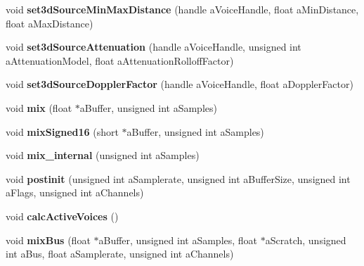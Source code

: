 \begin{DoxyCompactItemize}
\item 
\mbox{\label{class_so_loud_1_1_soloud_a16f6e9dc7eed886e42d3062e04615fd1}} 
void {\bfseries set3d\+Source\+Min\+Max\+Distance} (handle a\+Voice\+Handle, float a\+Min\+Distance, float a\+Max\+Distance)
\item 
\mbox{\label{class_so_loud_1_1_soloud_afa03763fb26028520a0fd4af529a0aa0}} 
void {\bfseries set3d\+Source\+Attenuation} (handle a\+Voice\+Handle, unsigned int a\+Attenuation\+Model, float a\+Attenuation\+Rolloff\+Factor)
\item 
\mbox{\label{class_so_loud_1_1_soloud_a9909a030c0a5965bd99a8d3b3751783f}} 
void {\bfseries set3d\+Source\+Doppler\+Factor} (handle a\+Voice\+Handle, float a\+Doppler\+Factor)
\item 
\mbox{\label{class_so_loud_1_1_soloud_a2979c68d9d6378463821563f2d8269e9}} 
void {\bfseries mix} (float $\ast$a\+Buffer, unsigned int a\+Samples)
\item 
\mbox{\label{class_so_loud_1_1_soloud_ae7aab6e58183f9d5f109e6386ff2f449}} 
void {\bfseries mix\+Signed16} (short $\ast$a\+Buffer, unsigned int a\+Samples)
\item 
\mbox{\label{class_so_loud_1_1_soloud_af89412fb8b19db246b56eb017e75bc4a}} 
void {\bfseries mix\+\_\+internal} (unsigned int a\+Samples)
\item 
\mbox{\label{class_so_loud_1_1_soloud_a2fdc5f40776decff79e8d069ba63d308}} 
void {\bfseries postinit} (unsigned int a\+Samplerate, unsigned int a\+Buffer\+Size, unsigned int a\+Flags, unsigned int a\+Channels)
\item 
\mbox{\label{class_so_loud_1_1_soloud_ad504d7bf238588fa6d37d464d2c1124e}} 
void {\bfseries calc\+Active\+Voices} ()
\item 
\mbox{\label{class_so_loud_1_1_soloud_ad3f197faaa8ccbded9def5a6d4680b00}} 
void {\bfseries mix\+Bus} (float $\ast$a\+Buffer, unsigned int a\+Samples, float $\ast$a\+Scratch, unsigned int a\+Bus, float a\+Samplerate, unsigned int a\+Channels)

\end{DoxyCompactItemize}
